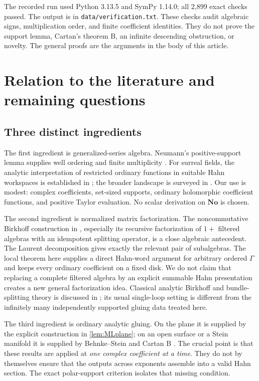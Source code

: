 \documentclass[11pt,letterpaper]{article}
\theoremstyle{definition}
\theoremstyle{remark}
\newcommand{\No}{\mathbf{No}}
\numberwithin{equation}{section}
\begin{document}
The recorded run used Python 3.13.5 and SymPy 1.14.0; all 2,899 exact checks passed. The output is in \texttt{data/verification.txt}. These checks audit algebraic signs, multiplication order, and finite coefficient identities. They do not prove the support lemma, Cartan's theorem B, an infinite descending obstruction, or novelty. The general proofs are the arguments in the body of this article.

\section{Relation to the literature and remaining questions}\label{sec:literature}

\subsection{Three distinct ingredients}

The first ingredient is generalized-series algebra. Neumann's positive-support lemma supplies well ordering and finite multiplicity \cite{Neumann}. For surreal fields, the analytic interpretation of restricted ordinary functions in suitable Hahn workspaces is established in \cite{vdDE}; the broader landscape is surveyed in \cite{MantovaMatusinski}. Our use is modest: complex coefficients, set-sized supports, ordinary holomorphic coefficient functions, and positive Taylor evaluation. No scalar derivation on $\No$ is chosen.

The second ingredient is normalized matrix factorization. The noncommutative Birkhoff construction in \cite{EFGK}, especially its recursive factorization of $1+$ filtered algebras with an idempotent splitting operator, is a close algebraic antecedent. The Laurent decomposition gives exactly the relevant pair of subalgebras. The local theorem here supplies a direct Hahn-word argument for arbitrary ordered $\Gamma$ and keeps every ordinary coefficient on a fixed disk. We do not claim that replacing a complete filtered algebra by an explicit summable Hahn presentation creates a new general factorization idea. Classical analytic Birkhoff and bundle-splitting theory is discussed in \cite{Wone}; its usual single-loop setting is different from the infinitely many independently supported gluing data treated here.

The third ingredient is ordinary analytic gluing. On the plane it is supplied by the explicit construction in \cref{lem:MLplane}; on an open surface or a Stein manifold it is supplied by Behnke--Stein and Cartan B \cite{BS,Cartan,Schmitt}. The crucial point is that these results are applied at \emph{one complex coefficient at a time}. They do not by themselves ensure that the outputs across exponents assemble into a valid Hahn section. The exact polar-support criterion isolates that missing condition.
\end{document}

